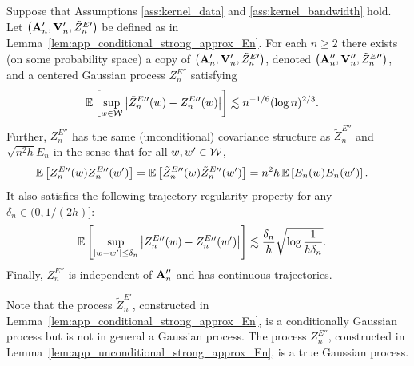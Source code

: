 \begin{lemma}
  \label{lem:app_unconditional_strong_approx_En}

  Suppose that Assumptions
  \ref{ass:kernel_data} and \ref{ass:kernel_bandwidth} hold.
  Let
  $\big(\mathbf{A}_n', \mathbf{V}_n', \tilde Z_n^{E\prime}\big)$
  be defined as in
  Lemma~\ref{lem:app_conditional_strong_approx_En}.
  For each $n \geq 2$
  there exists
  (on some probability space)
  a copy of
  $\big(\mathbf{A}_n', \mathbf{V}_n', \tilde Z_n^{E\prime}\big)$,
  denoted
  $\big(\mathbf{A}_n'', \mathbf{V}_n'', \tilde Z_n^{E\prime\prime}\big)$,
  and a centered
  Gaussian process
  $Z^{E\dprime}_n$
  satisfying
  \begin{align*}
    \mathbb{E}\left[
      \sup_{w \in \mathcal{W}}
      \big|\tilde Z_n^{E\prime\prime}(w) - Z_n^{E\prime\prime}(w)\big|
    \right]
    &\lesssim
    n^{-1/6} (\log n)^{2/3}.
  \end{align*}
  Further,
  $Z_n^{E\dprime}$ has the same
  (unconditional) covariance structure as
  $\tilde Z_n^{E\dprime}$
  and
  $\sqrt{n^2h} E_n$
  in the sense that for all $w, w' \in \mathcal{W}$,
  \begin{align*}
    \mathbb{E}\left[
      Z_n^{E\prime\prime}(w)
      Z_n^{E\prime\prime}(w')
    \right]
    &=
    \mathbb{E}\left[
      \tilde Z_n^{E\prime\prime}(w)
      \tilde Z_n^{E\prime\prime}(w')
    \right]
    =
    n^2h \,
    \mathbb{E}\left[
      E_n(w)
      E_n(w')
    \right].
  \end{align*}
  It also satisfies the following
  trajectory regularity property
  for any $\delta_n \in (0, 1/(2h)]$:
  \begin{align*}
    \mathbb{E}\left[
      \sup_{|w-w'| \leq \delta_n}
      \big|
      Z_n^{E\prime\prime}(w)
      - Z_n^{E\prime\prime}(w')
      \big|
    \right]
    &\lesssim
    \frac{\delta_n}{h}
    \sqrt{\log \frac{1}{h\delta_n}}.
  \end{align*}
  Finally, $Z_n^{E\dprime}$ is independent of $\mathbf{A}_n''$
  and has continuous trajectories.

\end{lemma}

\begin{remark}

  Note that the process $\tilde Z_n^{E\prime}$,
  constructed in Lemma~\ref{lem:app_conditional_strong_approx_En},
  is a conditionally Gaussian process but is
  not in general a Gaussian process.
  The process $Z_n^{E\dprime}$,
  constructed in Lemma~\ref{lem:app_unconditional_strong_approx_En},
  is a true Gaussian process.

\end{remark}

